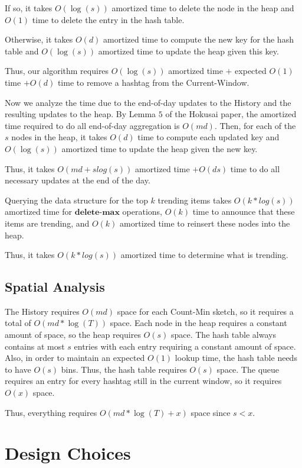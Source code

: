 \documentclass[twoside]{article}
\begin{document}
{If so, it takes $O(\log(s))$ amortized time to delete the node in the heap and $O(1)$ time to delete the entry in the hash table.

Otherwise, it takes $O(d)$ amortized time to compute the new key for the hash table and $O(\log(s))$ amortized time to update the heap given this key.

Thus, our algorithm requires $O(\log(s))$ amortized time $+$ expected $O(1)$ time  $+ O(d)$ time to remove a hashtag from the Current-Window.

Now we analyze the time due to the end-of-day updates to the History and the resulting updates to the heap. By Lemma $5$ of the Hokusai paper, the amortized time required to do all end-of-day aggregation is $O(md)$. Then, for each of the $s$ nodes in the heap, it takes $O(d)$ time to compute each updated key and $O(\log(s))$ amortized time to update the heap given the new key.

Thus, it takes $O(md + slog(s))$ amortized time $+ O(ds)$ time to do all necessary updates at the end of the day.

Querying the data structure for the top $k$ trending items takes $O(k*log(s))$ amortized time for $\textbf{delete-max}$ operations, $O(k)$ time to announce that these items are trending, and $O(k)$ amortized time to reinsert these nodes into the heap.

Thus, it takes $O(k*log(s))$ amortized time to determine what is trending.


\subsection{Spatial Analysis}

The History requires $O(md)$ space for each Count-Min sketch, so it requires a total of $O(md*\log(T))$ space.
Each node in the heap requires a constant amount of space, so the heap requires $O(s)$ space.
The hash table always contains at most $s$ entries with each entry requiring a constant amount of space.  Also, in order to maintain an expected $O(1)$ lookup time, the hash table needs to have $O(s)$ bins.  Thus, the hash table requires $O(s)$ space.
The queue requires an entry for every hashtag still in the current window, so it requires $O(x)$ space.

Thus, everything requires $O(md*\log(T) + x)$ space since $s < x$.


\section{Design Choices}

}
\end{document}
